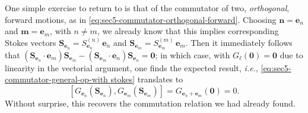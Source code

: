 \documentclass[11pt,a4paper]{article}
\newcommand{\be}{\begin{equation}}
\newcommand{\ee}{\end{equation}}
\begin{document}
One simple exercise to return to is that of the commutator of two, \textit{orthogonal}, forward motions, as in \eqref{eq:sec5-commutator-orthogonal-forward}. Choosing $\boldsymbol{n} = \boldsymbol{e}_{n}$ and $\boldsymbol{m} = \boldsymbol{e}_{m}$, with $n \neq m$, we already know that this implies corresponding Stokes vectors $\boldsymbol{S}_{\boldsymbol{e}_n} = S_{\boldsymbol{e}_n}^{(n)}\, \boldsymbol{e}_n$ and $\boldsymbol{S}_{\boldsymbol{e}_m} = S_{\boldsymbol{e}_m}^{(m)}\, \boldsymbol{e}_m$. Then it immediately follows that $\left( \boldsymbol{S}_{\boldsymbol{e}_n} \cdot \boldsymbol{e}_{m} \right) \boldsymbol{S}_{\boldsymbol{e}_m} - \left( \boldsymbol{S}_{\boldsymbol{e}_m} \cdot \boldsymbol{e}_{n} \right) \boldsymbol{S}_{\boldsymbol{e}_n} = \boldsymbol{0}$; in which case, with $G_{\boldsymbol{\ell}} (\boldsymbol{0}) = \boldsymbol{0}$ due to linearity in the vectorial argument, one finds the expected result, \textit{i.e.}, \eqref{eq:sec5-commutator-general-op-with stokes} translates to
%
\be
\left[ G_{\boldsymbol{e}_n} (\boldsymbol{S}_{\boldsymbol{e}_n}), G_{\boldsymbol{e}_m} (\boldsymbol{S}_{\boldsymbol{e}_m}) \right] = G_{\boldsymbol{e}_n+\boldsymbol{e}_m} (\boldsymbol{0}) = 0.
\ee
%
\noindent
Without surprise, this recovers the commutation relation we had already found.
\end{document}
